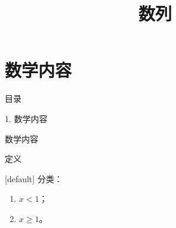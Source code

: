 \documentclass[aspectratio=169,10pt,fontset=fandol]{ctexbeamer}
\title{数列}
\begin{document}
\section{数学内容}
\begin{frame}[t,fragile]{目录}
\normalsize
{\color{blue}\normalsize 1. 数学内容\par}\vspace{0.3em}
\end{frame}
\begin{frame}[t,fragile]{数学内容}
\normalsize
\begin{block}{定义}
{\normalsize
{}[default]
分类：\begin{enumerate}[(1)]\item $x<1$；\item $x\geq1$。\end{enumerate}
}
\end{block}
\end{frame}
\end{document}
